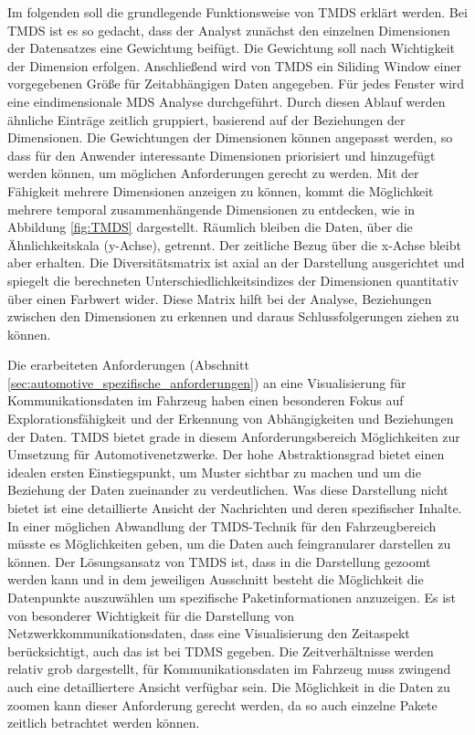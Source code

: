 \documentclass[draft=false
              ,paper=a4
              ,twoside=false
              ,fontsize=11pt
              ,headsepline
              ,BCOR10mm
              ,DIV11
              ]{scrbook}
\begin{document}
Im folgenden soll die grundlegende Funktionsweise von TMDS erklärt werden. Bei TMDS ist es so gedacht, dass der Analyst zunächst den einzelnen Dimensionen der Datensatzes eine Gewichtung beifügt. Die Gewichtung soll nach Wichtigkeit der Dimension erfolgen. Anschließend wird von TMDS ein Siliding Window einer vorgegebenen Größe für Zeitabhängigen Daten angegeben. Für jedes Fenster wird eine eindimensionale MDS Analyse durchgeführt. Durch diesen Ablauf werden ähnliche Einträge zeitlich gruppiert, basierend auf der Beziehungen der Dimensionen. Die Gewichtungen der Dimensionen können angepasst werden, so dass für den Anwender interessante Dimensionen priorisiert und hinzugefügt werden können, um möglichen Anforderungen gerecht zu werden. Mit der Fähigkeit mehrere Dimensionen anzeigen zu können, kommt die Möglichkeit mehrere temporal zusammenhängende Dimensionen zu entdecken, wie in Abbildung \ref{fig:TMDS} dargestellt. Räumlich bleiben die Daten, über die Ähnlichkeitskala (y-Achse), getrennt. Der zeitliche Bezug über die x-Achse bleibt aber erhalten. Die Diversitätsmatrix ist axial an der Darstellung ausgerichtet und spiegelt die berechneten Unterschiedlichkeitsindizes der Dimensionen quantitativ über einen Farbwert wider. Diese Matrix hilft bei der Analyse, Beziehungen zwischen den Dimensionen zu erkennen und daraus Schlussfolgerungen ziehen zu können.

Die erarbeiteten Anforderungen (Abschnitt \ref{sec:automotive_spezifische_anforderungen}) an eine Visualisierung für Kommunikationsdaten im Fahrzeug haben einen besonderen Fokus auf Explorationsfähigkeit und der Erkennung von Abhängigkeiten und Beziehungen der Daten. TMDS bietet grade in diesem Anforderungsbereich Möglichkeiten zur Umsetzung für Automotivenetzwerke. Der hohe Abstraktionsgrad bietet einen idealen ersten Einstiegspunkt, um Muster sichtbar zu machen und um die Beziehung der Daten zueinander zu verdeutlichen. Was diese Darstellung nicht bietet ist eine detaillierte Ansicht der Nachrichten und deren spezifischer Inhalte. In einer möglichen Abwandlung der TMDS-Technik für den Fahrzeugbereich müsste es Möglichkeiten geben, um die Daten auch feingranularer darstellen zu können. Der Lösungsansatz von TMDS ist, dass in die Darstellung gezoomt werden kann und in dem jeweiligen Ausschnitt besteht die Möglichkeit die Datenpunkte auszuwählen um spezifische Paketinformationen anzuzeigen. 
Es ist von besonderer Wichtigkeit für die Darstellung von Netzwerkkommunikationsdaten, dass eine Visualisierung den Zeitaspekt berücksichtigt, auch das ist bei TDMS gegeben. Die Zeitverhältnisse werden relativ grob dargestellt, für Kommunikationsdaten im Fahrzeug muss zwingend auch eine detailliertere Ansicht verfügbar sein. Die Möglichkeit in die Daten zu zoomen kann dieser Anforderung gerecht werden, da so auch einzelne Pakete zeitlich betrachtet werden können. 
\end{document}
